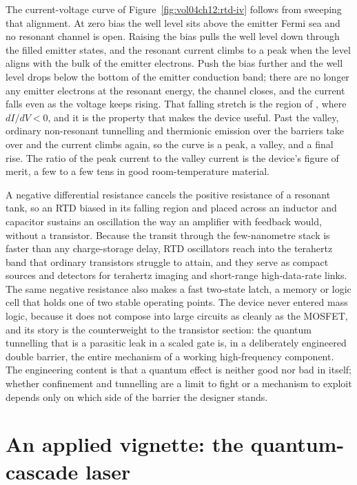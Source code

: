 The current-voltage curve of Figure~\ref{fig:vol04ch12:rtd-iv} follows from
sweeping that alignment. At zero bias the well level sits above the emitter
Fermi sea and no resonant channel is open. Raising the bias pulls the well
level down through the filled emitter states, and the resonant current climbs
to a peak when the level aligns with the bulk of the emitter electrons. Push
the bias further and the well level drops below the bottom of the emitter
conduction band; there are no longer any emitter electrons at the resonant
energy, the channel closes, and the current falls even as the voltage keeps
rising. That falling stretch is the region of , where $dI/dV < 0$, and it is the property that makes the device
useful. Past the valley, ordinary non-resonant tunnelling and thermionic
emission over the barriers take over and the current climbs again, so the
curve is a peak, a valley, and a final rise. The ratio of the peak current to
the valley current is the device's figure of merit, a few to a few tens in
good room-temperature material.

A negative differential resistance cancels the positive resistance of a
resonant tank, so an RTD biased in its falling region and placed across an
inductor and capacitor sustains an oscillation the way an amplifier with
feedback would, without a transistor. Because the transit through the
few-nanometre stack is faster than any charge-storage delay, RTD oscillators
reach into the terahertz band that ordinary transistors struggle to attain,
and they serve as compact sources and detectors for terahertz imaging and
short-range high-data-rate links. The same negative resistance also makes a
fast two-state latch, a memory or logic cell that holds one of two stable
operating points. The device never entered mass logic, because it does not
compose into large circuits as cleanly as the MOSFET, and its story is the
counterweight to the transistor section: the quantum tunnelling that is a
parasitic leak in a scaled gate is, in a deliberately engineered double
barrier, the entire mechanism of a working high-frequency component. The
engineering content is that a quantum effect is neither good nor bad in
itself; whether confinement and tunnelling are a limit to fight or a
mechanism to exploit depends only on which side of the barrier the designer
stands.



\section{An applied vignette: the quantum-cascade laser}

